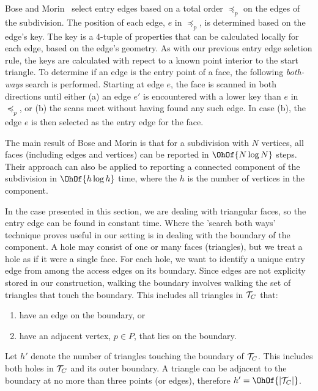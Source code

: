 {  Bose and Morin~\cite{DBLP:conf/isaac/BoseM00} select entry edges based 
  on a total order $\preceq_p$ on the edges of the subdivision. 
  The position of each edge, $e$ in $\preceq_p$, is determined based on 
  the edge's key. 
  The key is a 4-tuple of properties that can be calculated locally for 
  each edge, based on the edge's geometry. 
  As with our previous entry edge seletion rule, the keys are calculated 
  with repect to a known point interior to the start triangle.
  To determine if an edge is the entry point of a face, the following 
  \emph{both-ways} search is performed.
  Starting at edge $e$, the face is scanned in both directions 
  until either (a) an edge $e'$ is encountered with 
  a lower key than $e$ in $\preceq_p$, or (b) the scans meet without 
  having found any such edge.  
  In case (b), the edge $e$ is then selected as the entry edge for 
  the face.

  The main result of Bose and Morin is that for a subdivision 
  with $N$ vertices, all faces (including edges and vertices) can be 
  reported in $\OhOf{N \log{N}}$ steps. 
  Their approach can also be applied to reporting a connected 
  component of the subdivision in $\OhOf{h \log{h}}$ time, where the 
  $h$ is the number of vertices in the component.  

  In the case presented in this section, we are dealing with 
  triangular faces, so the entry edge can be found in constant time.
  Where the 'search both ways' technique proves useful in our setting 
  is in dealing with the boundary of the component. 
  A hole may consist of 
  one or many faces (triangles), but we treat a hole as if it were a 
  single face.
  For each hole, we want to identify a unique entry edge from among
  the access edges on its boundary.
  Since edges are not explicity stored in our construction, walking
  the boundary involves walking the set of triangles that touch the boundary. 
  This includes all triangles in ${\mathcal{T}}_C$ that:
  
  \begin{enumerate}
  \item have an edge on the boundary, or
  \item have an adjacent vertex, $p \in P$, that lies on the boundary.
  \end{enumerate}
  
  Let $h'$ denote the number of triangles touching the boundary of
  ${\mathcal{T}}_C$. 
  This includes both holes in ${\mathcal{T}}_C$ and its outer boundary.
  A triangle can be adjacent to the boundary at no more than three 
  points (or edges), therefore $h' = \OhOf{|\concomp|}$. 
  
}
